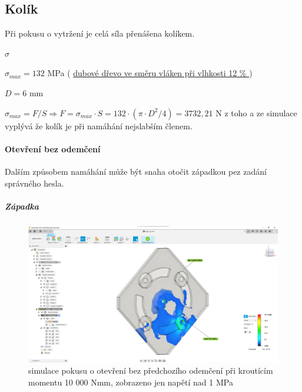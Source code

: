 \newpage

\subsection{Kolík}
Při pokusu o vytržení je celá síla přenášena kolíkem.

\begin{table}[h]
    \centering
    \caption{Tabulka použitých symbolu pro napětí v kolíku v tahu}
    \label{tab:M3_symboly_kolik}
\end{table}

 $ \sigma $     

 $ \sigma_{max} = 132  $ MPa    ( \href{https://is.mendelu.cz/eknihovna/opory/zobraz_cast.pl?fit_w=1;cast=9190}{dubové dřevo ve směru vláken při vlhkosti 12 \% }) %

$D = 6$ mm %

 \(\sigma_{max} = F/S \Rightarrow F = \sigma_{max} \cdot S = 132 \cdot (\pi \cdot D^2/4) = 3 732,21 \) N  z toho a ze simulace vyplývá že kolík je při namáhání nejslabším členem.

\paragraph{Otevření bez odemčení}
Dalším způsobem namáhání může být snaha otočit západkou pez zadání správného hesla.

\subparagraph{Západka}

\begin{figure}[htbp]
    \centering
    \includegraphics[width=\textwidth]{kapitoly/obrazky/M3/simulace/odolnost_proti_nasilnemu_odemceni_10Nm.png}
    \caption{simulace pokusu o otevření bez předchozího odemčení při kroutícím momentu 10 000 Nmm, zobrazeno jen napětí nad 1 MPa}
    \label{fig:M3-simulace-vytrzeni}
\end{figure}

